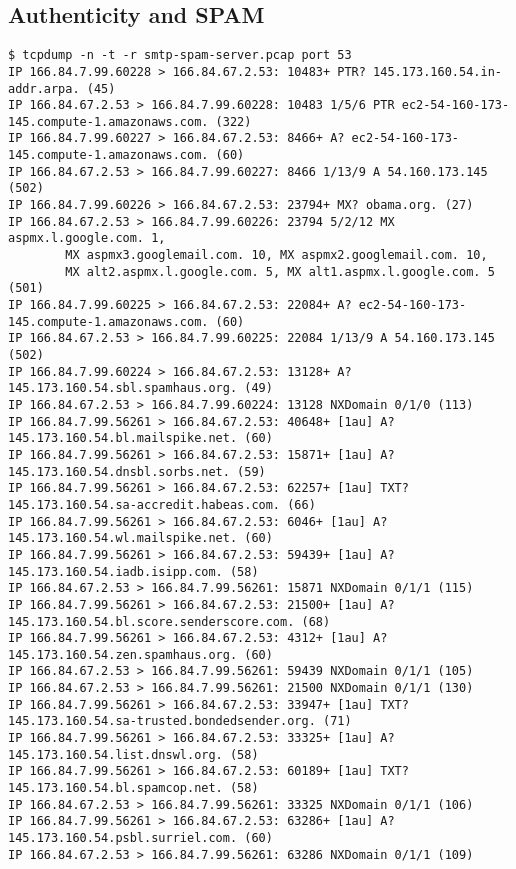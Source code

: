 \documentclass[xga]{xdvislides}
\begin{document}
\subsection{Authenticity and SPAM}
\smallish
\begin{verbatim}
$ tcpdump -n -t -r smtp-spam-server.pcap port 53
IP 166.84.7.99.60228 > 166.84.67.2.53: 10483+ PTR? 145.173.160.54.in-addr.arpa. (45)
IP 166.84.67.2.53 > 166.84.7.99.60228: 10483 1/5/6 PTR ec2-54-160-173-145.compute-1.amazonaws.com. (322)
IP 166.84.7.99.60227 > 166.84.67.2.53: 8466+ A? ec2-54-160-173-145.compute-1.amazonaws.com. (60)
IP 166.84.67.2.53 > 166.84.7.99.60227: 8466 1/13/9 A 54.160.173.145 (502)
IP 166.84.7.99.60226 > 166.84.67.2.53: 23794+ MX? obama.org. (27)
IP 166.84.67.2.53 > 166.84.7.99.60226: 23794 5/2/12 MX aspmx.l.google.com. 1,
        MX aspmx3.googlemail.com. 10, MX aspmx2.googlemail.com. 10,
        MX alt2.aspmx.l.google.com. 5, MX alt1.aspmx.l.google.com. 5 (501)
IP 166.84.7.99.60225 > 166.84.67.2.53: 22084+ A? ec2-54-160-173-145.compute-1.amazonaws.com. (60)
IP 166.84.67.2.53 > 166.84.7.99.60225: 22084 1/13/9 A 54.160.173.145 (502)
IP 166.84.7.99.60224 > 166.84.67.2.53: 13128+ A? 145.173.160.54.sbl.spamhaus.org. (49)
IP 166.84.67.2.53 > 166.84.7.99.60224: 13128 NXDomain 0/1/0 (113)
IP 166.84.7.99.56261 > 166.84.67.2.53: 40648+ [1au] A? 145.173.160.54.bl.mailspike.net. (60)
IP 166.84.7.99.56261 > 166.84.67.2.53: 15871+ [1au] A? 145.173.160.54.dnsbl.sorbs.net. (59)
IP 166.84.7.99.56261 > 166.84.67.2.53: 62257+ [1au] TXT? 145.173.160.54.sa-accredit.habeas.com. (66)
IP 166.84.7.99.56261 > 166.84.67.2.53: 6046+ [1au] A? 145.173.160.54.wl.mailspike.net. (60)
IP 166.84.7.99.56261 > 166.84.67.2.53: 59439+ [1au] A? 145.173.160.54.iadb.isipp.com. (58)
IP 166.84.67.2.53 > 166.84.7.99.56261: 15871 NXDomain 0/1/1 (115)
IP 166.84.7.99.56261 > 166.84.67.2.53: 21500+ [1au] A? 145.173.160.54.bl.score.senderscore.com. (68)
IP 166.84.7.99.56261 > 166.84.67.2.53: 4312+ [1au] A? 145.173.160.54.zen.spamhaus.org. (60)
IP 166.84.67.2.53 > 166.84.7.99.56261: 59439 NXDomain 0/1/1 (105)
IP 166.84.67.2.53 > 166.84.7.99.56261: 21500 NXDomain 0/1/1 (130)
IP 166.84.7.99.56261 > 166.84.67.2.53: 33947+ [1au] TXT? 145.173.160.54.sa-trusted.bondedsender.org. (71)
IP 166.84.7.99.56261 > 166.84.67.2.53: 33325+ [1au] A? 145.173.160.54.list.dnswl.org. (58)
IP 166.84.7.99.56261 > 166.84.67.2.53: 60189+ [1au] TXT? 145.173.160.54.bl.spamcop.net. (58)
IP 166.84.67.2.53 > 166.84.7.99.56261: 33325 NXDomain 0/1/1 (106)
IP 166.84.7.99.56261 > 166.84.67.2.53: 63286+ [1au] A? 145.173.160.54.psbl.surriel.com. (60)
IP 166.84.67.2.53 > 166.84.7.99.56261: 63286 NXDomain 0/1/1 (109)

\end{verbatim}
\end{document}
